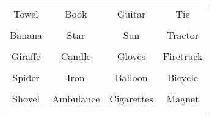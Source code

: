 \documentclass[12pt,a4paper]{article}
\begin{document}
\thispagestyle{empty}
\begin{table}[]
\centering
\Huge
\begin{tabular}{cccc}
 Towel& Book& Guitar& Tie\\  & & & \\
 Banana& Star& Sun& Tractor\\  & & & \\
 Giraffe& Candle& Gloves& Firetruck\\  & & & \\
 Spider& Iron& Balloon& Bicycle\\  & & & \\
 Shovel& Ambulance& Cigarettes& Magnet\\  & & & \\
\end{tabular}
\end{table}
\end{document}

